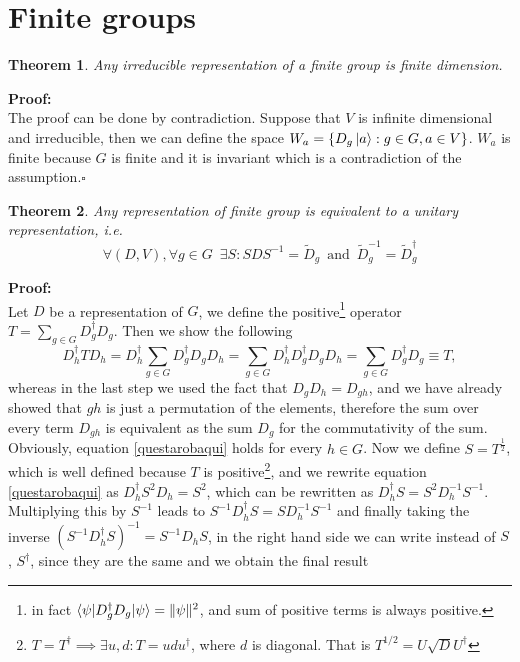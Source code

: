 \documentclass[12pt]{book}
\theoremstyle{plain}
\newtheorem{thm}{Theorem}[section]
\theoremstyle{definition}
\theoremstyle{remark}
\begin{document}
\section{Finite groups}
\begin{thm}
Any irreducible representation of a finite group is finite dimension.
\end{thm}
\hspace{-1.4em}\textbf{Proof:}\\
The proof can be done by contradiction. Suppose that $V$ is infinite dimensional and irreducible, then we can define the space $W_a = \{D_g \ket{a}:g\in G,a\in V\}$. $W_a$ is finite because $G$ is finite and it is invariant which is a contradiction of the assumption.\hfill\ensuremath{\square}
\begin{thm}\label{unitaryrepresentation}
Any representation of finite group is equivalent to a unitary representation, i.e.
\[\forall (D,V),\forall g\in G \,\,\, \exists S:SDS^{-1} = \widetilde{D}_g \,\,\,\text{and}\,\,\, \widetilde{D}_g^{-1} = \widetilde{D}_g^\dagger  \]
\end{thm}
\hspace{-1.4em}\textbf{Proof:}\\
Let $D$ be a representation of $G$, we define the positive\footnote{in fact $\braket{\psi|D^\dagger_gD_g|\psi}=\|\psi\|^2$, and sum of positive terms is always positive.} operator $T = \displaystyle\sum_{g\in G}D^\dagger_gD_g$. Then we show the following
\begin{equation}\label{questarobaqui}
D_h^\dagger T D_h = D_h^\dagger \sum_{g\in G} D_g^\dagger D_g D_h = \sum_{g\in G} D_h^\dagger D_g^\dagger D_gD_h = \sum_{g\in G} D_g^\dagger D_g  \equiv T,
\end{equation}
whereas in the last step we used the fact that $D_gD_h = D_{gh}$, and we have already showed that $gh$ is just a permutation of the elements, therefore the sum over every term $D_{gh}$ is equivalent as the sum $D_g$ for the commutativity of the sum. Obviously, equation \eqref{questarobaqui} holds for every $h\in G$. Now we define $S =T^{\frac{1}{2}}$, which is well defined because $T$ is positive\footnote{$T= T^\dagger\implies \exists u,d:T=udu^\dagger$, where $d$ is diagonal. That is $T^{1/2}=U\sqrt{D}U^\dagger$}, and we rewrite equation \eqref{questarobaqui}
as $D_h^\dagger S^2 D_h = S^2$, which can be rewritten as $D_h^\dagger S = S^2 D_h^{-1}S^{-1}$. Multiplying this by $S^{-1}$ leads to $S^{-1}D_h^\dagger S = SD_h^{-1}S^{-1}$ and finally taking the inverse $(S^{-1}D_h^\dagger S)^{-1} = S^{-1}D_hS$, in the right hand side we can write instead of $S$, $S^\dagger$, since they are the same and we obtain the final result
\end{document}
